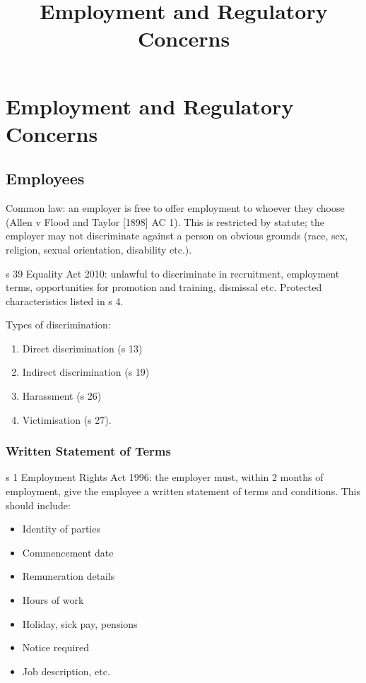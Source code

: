 \documentclass[
]{article}
\title{Employment and Regulatory Concerns}
\author{}
\date{}
\providecommand{\tightlist}{%
  \setlength{\itemsep}{0pt}\setlength{\parskip}{0pt}}
\begin{document}
\maketitle

{
\setcounter{tocdepth}{3}
\tableofcontents
}
\hypertarget{employment-and-regulatory-concerns}{%
\section{Employment and Regulatory
Concerns}\label{employment-and-regulatory-concerns}}

\hypertarget{employees}{%
\subsection{Employees}\label{employees}}

Common law: an employer is free to offer employment to whoever they
choose (Allen v Flood and Taylor {[}1898{]} AC 1). This is restricted by
statute; the employer may not discriminate against a person on obvious
grounds (race, sex, religion, sexual orientation, disability etc.).

s 39 Equality Act 2010: unlawful to discriminate in recruitment,
employment terms, opportunities for promotion and training, dismissal
etc. Protected characteristics listed in s 4.

Types of discrimination:

\begin{enumerate}
\tightlist
\item
  Direct discrimination (s 13)
\item
  Indirect discrimination (s 19)
\item
  Harassment (s 26)
\item
  Victimisation (s 27).
\end{enumerate}

\hypertarget{written-statement-of-terms}{%
\subsubsection{Written Statement of
Terms}\label{written-statement-of-terms}}

s 1 Employment Rights Act 1996: the employer must, within 2 months of
employment, give the employee a written statement of terms and
conditions. This should include:

\begin{itemize}
\tightlist
\item
  Identity of parties
\item
  Commencement date
\item
  Remuneration details
\item
  Hours of work
\item
  Holiday, sick pay, pensions
\item
  Notice required
\item
  Job description, etc.
\end{itemize}
\end{document}
